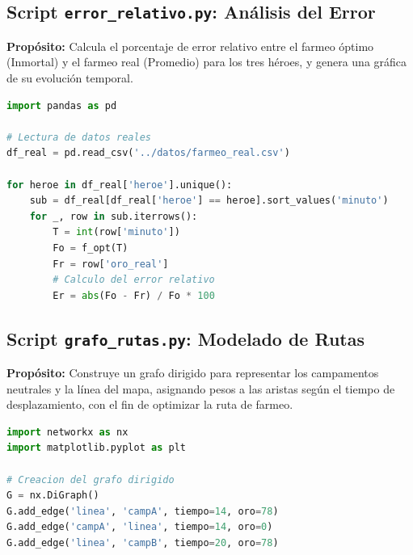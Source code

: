 \subsection{Script \texttt{error\_relativo.py}: Análisis del Error}
\textbf{Propósito:} Calcula el porcentaje de error relativo entre el farmeo óptimo (Inmortal) y el farmeo real (Promedio) para los tres héroes, y genera una gráfica de su evolución temporal.

\begin{lstlisting}[language=Python, frame=single, rulecolor=\color{black}, backgroundcolor=\color{backcolour}, caption=Código principal de \texttt{error\_relativo.py}]
import pandas as pd

# Lectura de datos reales
df_real = pd.read_csv('../datos/farmeo_real.csv')

for heroe in df_real['heroe'].unique():
    sub = df_real[df_real['heroe'] == heroe].sort_values('minuto')
    for _, row in sub.iterrows():
        T = int(row['minuto'])
        Fo = f_opt(T)
        Fr = row['oro_real']
        # Calculo del error relativo
        Er = abs(Fo - Fr) / Fo * 100 
\end{lstlisting}

\subsection{Script \texttt{grafo\_rutas.py}: Modelado de Rutas}
\textbf{Propósito:} Construye un grafo dirigido para representar los campamentos neutrales y la línea del mapa, asignando pesos a las aristas según el tiempo de desplazamiento, con el fin de optimizar la ruta de farmeo.

\begin{lstlisting}[language=Python, frame=single, rulecolor=\color{black}, backgroundcolor=\color{backcolour}, caption=Código principal de \texttt{grafo\_rutas.py}]
import networkx as nx
import matplotlib.pyplot as plt

# Creacion del grafo dirigido
G = nx.DiGraph()
G.add_edge('linea', 'campA', tiempo=14, oro=78)
G.add_edge('campA', 'linea', tiempo=14, oro=0)
G.add_edge('linea', 'campB', tiempo=20, oro=78)
\end{lstlisting}